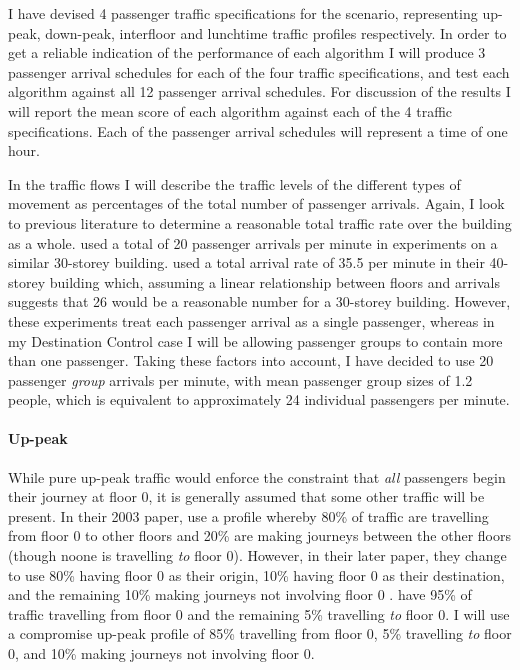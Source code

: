 \documentclass{UoYCSproject}
\begin{document}
I have devised 4 passenger traffic specifications for the scenario, representing up-peak, down-peak, interfloor and lunchtime traffic profiles respectively.  In order to get a reliable indication of the performance of each algorithm I will produce 3 passenger arrival schedules for each of the four traffic specifications, and test each algorithm against all 12 passenger arrival schedules.  For discussion of the results I will report the mean score of each algorithm against each of the 4 traffic specifications.  Each of the passenger arrival schedules will represent a time of one hour.

In the traffic flows I will describe the traffic levels of the different types of movement as percentages of the total number of passenger arrivals.  Again, I look to previous literature to determine a reasonable total traffic rate over the building as a whole.  \citet{Siikonen1993} used a total of 20 passenger arrivals per minute in experiments on a similar 30-storey building.  \citet{Rong2003} used a total arrival rate of 35.5 per minute in their 40-storey building which, assuming a linear relationship between floors and arrivals suggests that 26 would be a reasonable number for a 30-storey building.  However, these experiments treat each passenger arrival as a single passenger, whereas in my Destination Control case I will be allowing passenger groups to contain more than one passenger.  Taking these factors into account, I have decided to use 20 passenger \textit{group} arrivals per minute, with mean passenger group sizes of 1.2 people, which is equivalent to approximately 24 individual passengers per minute.

\paragraph{Up-peak}

While pure up-peak traffic would enforce the constraint that \textit{all} passengers begin their journey at floor 0, it is generally assumed that some other traffic will be present.  In their 2003 paper, \citet{Nikovski2003} use a profile whereby 80\% of traffic are travelling from floor 0 to other floors and 20\% are making journeys between the other floors (though noone is travelling \textit{to} floor 0).  However, in their later paper, they change to use 80\% having floor 0 as their origin, 10\% having floor 0 as their destination, and the remaining 10\% making journeys not involving floor 0 \citep{Brand2004}.  \citet{Rong2003} have 95\% of traffic travelling from floor 0 and the remaining 5\% travelling \textit{to} floor 0.  I will use a compromise up-peak profile of 85\% travelling from floor 0, 5\% travelling \textit{to} floor 0, and 10\% making journeys not involving floor 0.
\end{document}
